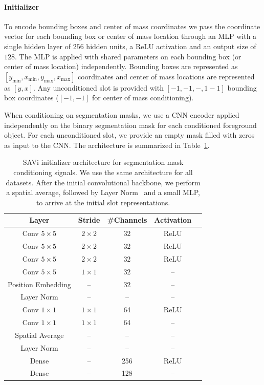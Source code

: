 \documentclass{article}
\begin{document}
\paragraph{Initializer}
To encode bounding boxes and center of mass coordinates we pass the coordinate vector for each bounding box or center of mass location through an MLP with a single hidden layer of $256$ hidden units, a ReLU activation and an output size of $128$. The MLP is applied with shared parameters on each bounding box (or center of mass location) independently. Bounding boxes are represented as $[y_{\text{min}}, x_{\text{min}}, y_{\text{max}},x_{\text{max}}]$ coordinates and center of mass locations are represented as $[y, x]$. Any unconditioned slot is provided with $[-1, -1, -,1 -1]$ bounding box coordinates ($[-1, -1]$ for center of mass conditioning).

When conditioning on segmentation masks, we use a CNN encoder applied independently on the binary segmentation mask for each conditioned foreground object. For each unconditioned slot, we provide an empty mask filled with zeros as input to the CNN. The architecture is summarized in Table~\ref{table:architecture_cnn_initializer}.

\begin{table}[htp!]
\centering
\caption{SAVi initializer architecture for segmentation mask conditioning signals. We use the same architecture for all datasets. After the initial convolutional backbone, we perform a spatial average, followed by Layer Norm~\citep{ba2016layer} and a small MLP, to arrive at the initial slot representations.}
\begin{tabular}{ccccc}
\toprule
Layer & Stride & \#Channels & Activation \\
\midrule 
Conv $5\times 5$ & $2\times 2$ & $32$ & ReLU\\
Conv  $5\times 5$ & $2\times 2$ & $32$& ReLU\\
Conv $5\times 5$ & $2\times 2$ & $32$ & ReLU\\
Conv  $5\times 5$ & $1\times 1$ & $32$ & --\\
Position Embedding & -- & $32$ & --\\
Layer Norm & -- & -- & --  \\ 
Conv $1\times 1$ & $1\times 1$ & 64 & ReLU \\ 
Conv $1\times 1$ & $1\times 1$ & 64 & -- \\ 
Spatial Average & -- & -- & --  \\ 
Layer Norm & -- & -- & --  \\ 
Dense & --& 256 & ReLU \\ 
Dense & -- & 128 & -- \\ 
\bottomrule
\end{tabular}
\label{table:architecture_cnn_initializer}
\end{table}
\end{document}
